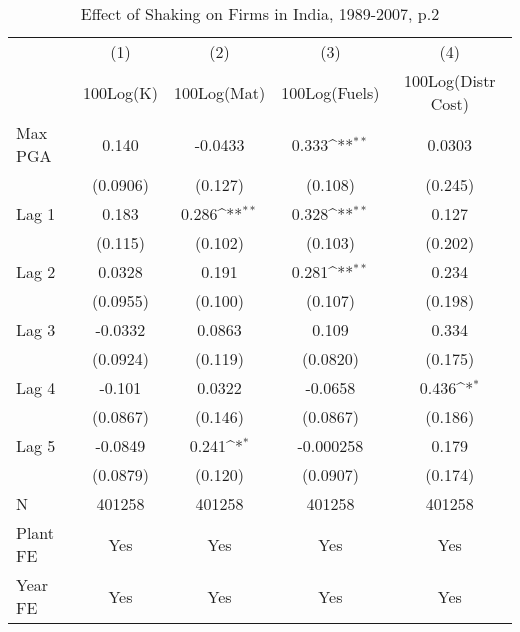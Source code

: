 \begin{table}[htbp]\centering
\def\sym#1{\ifmmode^{#1}\else\(^{#1}\)\fi}
\caption{Effect of Shaking on Firms in India, 1989-2007, p.2}
\begin{tabular}{l*{4}{c}}
\toprule
                &\multicolumn{1}{c}{(1)}&\multicolumn{1}{c}{(2)}&\multicolumn{1}{c}{(3)}&\multicolumn{1}{c}{(4)}\\
                &\multicolumn{1}{c}{100Log(K)}&\multicolumn{1}{c}{100Log(Mat)}&\multicolumn{1}{c}{100Log(Fuels)}&\multicolumn{1}{c}{100Log(Distr Cost)}\\
\midrule
Max PGA         &    0.140         &  -0.0433         &    0.333\sym{**} &   0.0303         \\
                & (0.0906)         &  (0.127)         &  (0.108)         &  (0.245)         \\
\addlinespace
Lag 1           &    0.183         &    0.286\sym{**} &    0.328\sym{**} &    0.127         \\
                &  (0.115)         &  (0.102)         &  (0.103)         &  (0.202)         \\
\addlinespace
Lag 2           &   0.0328         &    0.191         &    0.281\sym{**} &    0.234         \\
                & (0.0955)         &  (0.100)         &  (0.107)         &  (0.198)         \\
\addlinespace
Lag 3           &  -0.0332         &   0.0863         &    0.109         &    0.334         \\
                & (0.0924)         &  (0.119)         & (0.0820)         &  (0.175)         \\
\addlinespace
Lag 4           &   -0.101         &   0.0322         &  -0.0658         &    0.436\sym{*}  \\
                & (0.0867)         &  (0.146)         & (0.0867)         &  (0.186)         \\
\addlinespace
Lag 5           &  -0.0849         &    0.241\sym{*}  &-0.000258         &    0.179         \\
                & (0.0879)         &  (0.120)         & (0.0907)         &  (0.174)         \\
\midrule
N               &   401258         &   401258         &   401258         &   401258         \\
Plant FE        &      Yes         &      Yes         &      Yes         &      Yes         \\
Year FE         &      Yes         &      Yes         &      Yes         &      Yes         \\

\end{tabular}
\end{table}
